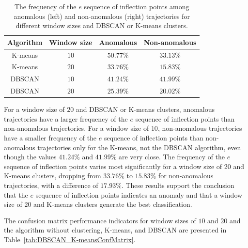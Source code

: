 \documentclass[preprint,12pt]{elsarticle}
\begin{document}
\begin{table}[!ht]
    \centering
    \begin{tabular}{|c|c|c|c|} \hline
        Algorithm & Window size & Anomalous & Non-anomalous \\ \hline
        K-means & $10$ & $50.77\%$ & $33.13\%$ \\ \hline
        K-means & $20$ & $33.76\%$ & $15.83\%$ \\ \hline
        DBSCAN & $10$ & $41.24\%$ & $41.99\%$ \\ \hline
        DBSCAN & $20$ & $25.39\%$ & $20.02\%$ \\ \hline
    \end{tabular}
    \caption{The frequency of the $e$ sequence of inflection points among anomalous (left) and non-anomalous (right) trajectories for different window sizes and DBSCAN or K-means clusters.}
    \label{tab:DBSCAN_K-meansAnomalySeq}
\end{table}

For a window size of $20$ and DBSCAN or K-means clusters, anomalous trajectories have a larger frequency of the $e$ sequence of inflection points than non-anomalous trajectories. For a window size of $10$, non-anomalous trajectories have a smaller frequency of the $e$ sequence of inflection points than non-anomalous trajectories only for the K-means, not the DBSCAN algorithm, even though the values $41.24\%$ and $41.99\%$ are very close. The frequency of the $e$ sequence of inflection points varies most significantly for a window size of $20$ and K-means clusters, dropping from $33.76\%$ to $15.83\%$ for non-anomalous trajectories, with a difference of $17.93\%$. These results support the conclusion that the $e$ sequence of inflection points indicates an anomaly and that a window size of $20$ and K-means clusters generate the best classification.

The confusion matrix performance indicators for window sizes of $10$ and $20$ and the algorithm without clustering, K-means, and DBSCAN are presented in Table~\ref{tab:DBSCAN_K-meansConfMatrix}.
\end{document}
